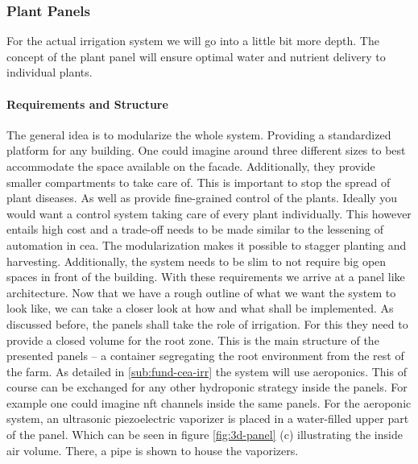 \subsubsection{Plant Panels}
For the actual irrigation system we will go into a little bit more depth.
The concept of the plant panel will ensure optimal water and nutrient delivery to individual plants.
\paragraph{Requirements and Structure}
The general idea is to modularize the whole system.
Providing a standardized platform for any building.
One could imagine around three different sizes to best accommodate the space available on the facade.
Additionally, they provide smaller compartments to take care of.
This is important to stop the spread of plant diseases.
As well as provide fine-grained control of the plants.
Ideally you would want a control system taking care of every plant individually.
This however entails high cost and a trade-off needs to be made similar to the lessening of automation in \ac{cea}.
The modularization makes it possible to stagger planting and harvesting.
Additionally, the system needs to be slim to not require big open spaces in front of the building.
With these requirements we arrive at a panel like architecture.
Now that we have a rough outline of what we want the system to look like, we can take a closer look at how and what shall be implemented.
As discussed before, the panels shall take the role of irrigation.
For this they need to provide a closed volume for the root zone.
This is the main structure of the presented panels -- a container segregating the root environment from the rest of the farm.
As detailed in \ref{sub:fund-cea-irr} the system will use aeroponics.
This of course can be exchanged for any other hydroponic strategy inside the panels.
For example one could imagine \ac{nft} channels inside the same panels.
For the aeroponic system, an ultrasonic piezoelectric vaporizer is placed in a water-filled upper part of the panel.
Which can be seen in figure \ref{fig:3d-panel} (c) illustrating the inside air volume.
There, a pipe is shown to house the vaporizers.
